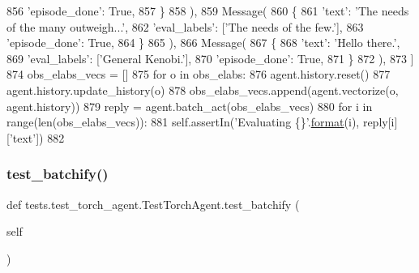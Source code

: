 \begin{DoxyCode}
856                     \textcolor{stringliteral}{'episode\_done'}: \textcolor{keyword}{True},
857                 \}
858             ),
859             Message(
860                 \{
861                     \textcolor{stringliteral}{'text'}: \textcolor{stringliteral}{'The needs of the many outweigh...'},
862                     \textcolor{stringliteral}{'eval\_labels'}: [\textcolor{stringliteral}{'The needs of the few.'}],
863                     \textcolor{stringliteral}{'episode\_done'}: \textcolor{keyword}{True},
864                 \}
865             ),
866             Message(
867                 \{
868                     \textcolor{stringliteral}{'text'}: \textcolor{stringliteral}{'Hello there.'},
869                     \textcolor{stringliteral}{'eval\_labels'}: [\textcolor{stringliteral}{'General Kenobi.'}],
870                     \textcolor{stringliteral}{'episode\_done'}: \textcolor{keyword}{True},
871                 \}
872             ),
873         ]
874         obs\_elabs\_vecs = []
875         \textcolor{keywordflow}{for} o \textcolor{keywordflow}{in} obs\_elabs:
876             agent.history.reset()
877             agent.history.update\_history(o)
878             obs\_elabs\_vecs.append(agent.vectorize(o, agent.history))
879         reply = agent.batch\_act(obs\_elabs\_vecs)
880         \textcolor{keywordflow}{for} i \textcolor{keywordflow}{in} range(len(obs\_elabs\_vecs)):
881             self.assertIn(\textcolor{stringliteral}{'Evaluating \{\}'}.\hyperlink{namespaceparlai_1_1chat__service_1_1services_1_1messenger_1_1shared__utils_a32e2e2022b824fbaf80c747160b52a76}{format}(i), reply[i][\textcolor{stringliteral}{'text'}])
882 
\end{DoxyCode}
\mbox{\label{classtests_1_1test__torch__agent_1_1TestTorchAgent_aad1075dad0c291b524d84ec9526177dd}} 
\subsubsection{\texorpdfstring{test\+\_\+batchify()}{test\_batchify()}}
{\footnotesize\ttfamily def tests.\+test\+\_\+torch\+\_\+agent.\+Test\+Torch\+Agent.\+test\+\_\+batchify (\begin{DoxyParamCaption}\item[{}]{self }\end{DoxyParamCaption})}

